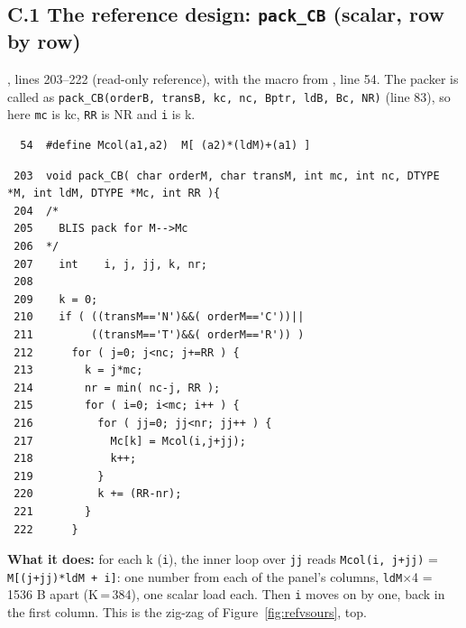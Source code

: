 \documentclass[10pt,a4paper]{article}
\begin{document}
\subsection*{C.1 The reference design: \texttt{pack\_CB} (scalar, row by row)}
, lines 203--222 (read-only reference), with the macro from
, line 54. The packer is called as \texttt{pack\_CB(orderB, transB, kc, nc, Bptr, ldB, Bc, NR)} (line 83), so here
\texttt{mc} is kc, \texttt{RR} is NR and \texttt{i} is k.
{\footnotesize\begin{verbatim}
  54  #define Mcol(a1,a2)  M[ (a2)*(ldM)+(a1) ]
\end{verbatim}}
{\footnotesize\begin{verbatim}
 203  void pack_CB( char orderM, char transM, int mc, int nc, DTYPE *M, int ldM, DTYPE *Mc, int RR ){
 204  /*
 205    BLIS pack for M-->Mc
 206  */
 207    int    i, j, jj, k, nr;
 208  
 209    k = 0;
 210    if ( ((transM=='N')&&( orderM=='C'))||
 211         ((transM=='T')&&( orderM=='R')) )
 212      for ( j=0; j<nc; j+=RR ) { 
 213        k = j*mc;
 214        nr = min( nc-j, RR );
 215        for ( i=0; i<mc; i++ ) {
 216          for ( jj=0; jj<nr; jj++ ) {
 217            Mc[k] = Mcol(i,j+jj);
 218            k++;
 219          }
 220          k += (RR-nr);
 221        }
 222      }
\end{verbatim}}

\textbf{What it does:} for each k (\texttt{i}), the inner loop over \texttt{jj} reads \texttt{Mcol(i, j+jj)} = \texttt{M[(j+jj)*ldM + i]}: one
number from each of the panel's columns, \texttt{ldM}$\times$4 = 1536 B apart (K\,=\,384), one scalar load each. Then \texttt{i} moves on
by one, back in the first column. This is the zig-zag of Figure~\ref{fig:refvsours}, top.
\end{document}
